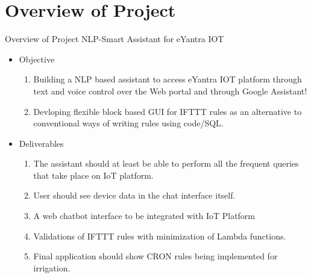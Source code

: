\documentclass[10pt, a4paper]{beamer}
\begin{document}
\section{Overview of Project}
\begin{frame}{Overview of Project}
	NLP-Smart Assistant for eYantra IOT
	\begin{itemize}
		\item Objective
		\begin{enumerate}	
			\item Building a NLP based assistant to access eYantra IOT platform  through text and voice control over the Web portal and through Google Assistant!
			\item Devloping flexible block based GUI for IFTTT rules as an alternative to conventional ways of writing rules using code/SQL.
		\end{enumerate}
		\item Deliverables 
		\begin{enumerate}
			\item The assistant should at least be able to perform all the frequent queries that take place on IoT platform.
			\item User should see device data in the chat interface itself.
			\item A web chatbot interface to be integrated with IoT Platform
			\item Validations of IFTTT rules with minimization of Lambda functions.
			\item Final application should show CRON rules being implemented for irrigation.
		\end{enumerate}
	\end{itemize}
\end{frame}
\end{document}
